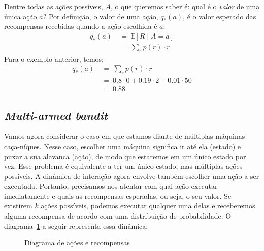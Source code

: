 \documentclass{article}
\begin{document}
            Dentre todas as ações possíveis, $A$, o que queremos saber é: qual é o \emph{valor} de uma única ação $a$? Por definição, o valor de uma ação, $q_*(a)$, é o valor esperado das recompensas recebidas quando a ação escolhida é $a$:
            \begin{equation}
            \begin{split}
                q_*(a) & \ = \ \mathbb{E}[R \mid A = a] \\
                & \ = \ \sum_{r}{} p(r) \cdot r
            \end{split}
            \end{equation}        
            Para o exemplo anterior, temos:            
            \begin{equation*}
            \begin{split}
                q_*(a) & \ = \ \sum_{r}{} p(r) \cdot r \\
                & \ = \ 0.8 \cdot 0 + 0.19 \cdot 2 + 0.01 \cdot 50 \\
                & \ = \ 0.88
            \end{split}
            \end{equation*}
            
        \subsection{\emph{Multi-armed bandit}}
    
            Vamos agora considerar o caso em que estamos diante de múltiplas máquinas caça-níques. Nesse caso, escolher uma máquina significa ir até ela (estado) e puxar a sua alavanca (ação), de modo que estaremos em um único estado por vez. Esse problema é equivalente a ter um único estado, mas múltiplas ações possíveis. A dinâmica de interação agora envolve também escolher uma ação a ser executada. Portanto, precisamos nos atentar com qual ação executar imediatamente e quais as recompensas esperadas, ou seja, o seu valor. Se existirem $k$ ações possíveis, podemos executar qualquer uma delas e receberemos alguma recompensa de acordo com uma distribuição de probabilidade. O diagrama~\ref{diag:simple-bandit} a seguir representa essa dinâmica:
        
            \begin{figure}[ht]
                \centering
                \simplebandit
                \caption{Diagrama de ações e recompensas}
                \label{diag:simple-bandit}
            \end{figure}
                    
\end{document}
